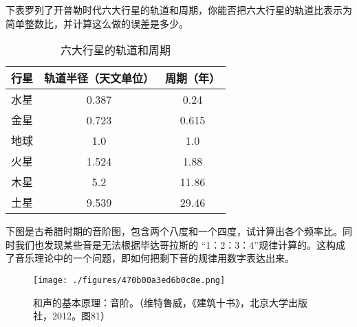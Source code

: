 \begin{exercise}{}
下表罗列了开普勒时代六大行星的轨道和周期，你能否把六大行星的轨道比表示为简单整数比，并计算这么做的误差是多少。

\begin{table}[ht]
\centering
\caption{六大行星的轨道和周期}\label{tab_ClBohr_2}
\begin{tabular}{|c|c|c|}
\hline
行星 & 轨道半径（天文单位） & 周期（年） \\
\hline
水星 & 0.387 & 0.24  \\
\hline
金星 & 0.723 & 0.615 \\
\hline
地球 & 1.0 & 1.0 \\
\hline
火星 & 1.524 & 1.88 \\
\hline
木星 & 5.2 & 11.86 \\
\hline
土星 & 9.539 & 29.46 \\
\hline
\end{tabular}
\end{table}
\end{exercise}

\begin{exercise}{}
下图是古希腊时期的音阶图，包含两个八度和一个四度，试计算出各个频率比。同时我们也发现某些音是无法根据毕达哥拉斯的 “1：2：3：4”规律计算的。这构成了音乐理论中的一个问题，即如何把剩下音的规律用数字表达出来。

\begin{figure}[ht]
\centering
\texttt{[image: ./figures/470b00a3ed6b0c8e.png]}
\caption{和声的基本原理：音阶。（维特鲁威，《建筑十书》，北京大学出版社，2012。图81）} \label{fig_ClBohr_7}
\end{figure}
\end{exercise}
